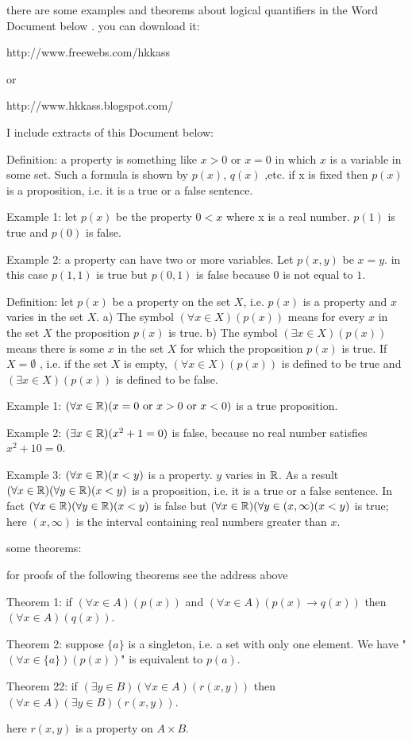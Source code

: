 \documentclass[12pt]{article}
\begin{document}
there are some examples and theorems about logical quantifiers in the Word Document below .
you can download it:

http://www.freewebs.com/hkkass

or

http://www.hkkass.blogspot.com/


I include extracts of this Document below:

Definition: a property is something like $x >0$ or $x=0$ in which $x$ is a variable in some set. Such a formula is shown by $p(x)$, $q(x)$ ,etc. if x is fixed then $p(x)$ is a proposition, i.e. it is a true or a false sentence.
 
Example 1: let $p(x)$ be the property $0 < x$ where x is a real number. $p(1)$ is true and $p(0)$ is false.
 
Example 2: a property can have two or more variables. Let $p(x,y)$ be $x=y$. in this case $p(1,1)$ is true but $p(0,1)$ is false because $0$ is not equal to $1$.

Definition: let $p(x)$ be a property on the set $X$, i.e. $p(x)$ is a property and $x$ varies in the set $X$. 
a) The symbol $(\forall x \in X)(p(x))$ means for every $x$ in the set $X$ the proposition $p(x)$ is true.
b) The symbol $(\exists x \in X)(p(x))$ means there is some $x$ in the set $X$ for which the proposition $p(x)$ is true.
If $X=\emptyset$ , i.e. if the set $X$ is empty, $(\forall x \in X)(p(x))$ is defined to be true and $(\exists x \in X)(p(x))$ is defined to be false. 
 
 
Example 1: $(\forall x \in \Bbb R)(x=0\text{ or }x > 0\text{ or }x < 0)$ is a true proposition. 
 
Example 2: $(\exists x \in \Bbb R)(x^2 +1=0)$ is false, because no real number satisfies $x^2+10=0$. 
 
Example 3: $(\forall x \in \Bbb R)(x < y)$ is a property. $y$ varies in $\Bbb R$. As a result $(\forall x \in \Bbb R)(\forall y \in \Bbb R) (x < y)$ is a proposition, i.e. it is a true or a false sentence. In fact 
$(\forall x \in \Bbb R)(\forall y \in \Bbb R)(x < y)$ is false but $(\forall x \in \Bbb R)(\forall y \in (x,\infty)(x < y)$ is true; here $(x,\infty)$ is the interval containing real numbers greater than $x$. 
 

some theorems:
 
for proofs of the following theorems see the address above

Theorem 1: if $(\forall x \in A)(p(x))$ and $(\forall x \in A)(p(x) \to q(x))$ then $(\forall x \in A)(q(x))$. 

Theorem 2: suppose $\{a\}$ is a singleton, i.e. a set with only one element. We have 
"$(\forall x \in \{a\})(p(x))$" is equivalent to $p(a)$. 


Theorem 22: if $(\exists y \in B)(\forall x \in A)(r(x,y))$ then $(\forall x \in A)(\exists y \in B)(r(x,y))$.

here $r(x,y)$ is a property on $A \times B$.
\end{document}
